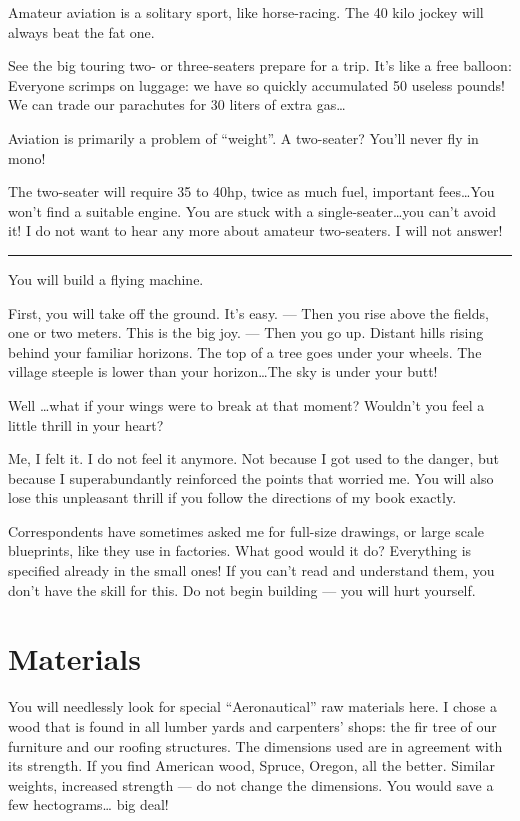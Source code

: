 \documentclass{book}
\newcommand*\sectline{
  \vspace{5pt}
  \begin{center}
    \rule{0.5\linewidth}{\linethickness}
  \end{center}
  \vspace{5pt}
}
\begin{document}
Amateur aviation is a solitary sport, like horse-racing. The 40 kilo
jockey will always beat the fat one.

See the big touring two- or three-seaters prepare for a trip. It's
like a free balloon: Everyone scrimps on luggage: we have so quickly
accumulated 50 useless pounds! We can trade our parachutes for 30
liters of extra gas\ldots

Aviation is primarily a problem of ``weight''. A two-seater? You'll
never fly in mono!

The two-seater will require 35 to 40hp, twice as much fuel, important
fees\ldots You won't find a suitable engine. You are stuck with a
single-seater\ldots you can't avoid it!  I do not want to hear any
more about amateur two-seaters. I will not answer!

\sectline

You will build a flying machine.

First, you will take off the ground. It's easy. --- Then you rise
above the fields, one or two meters. This is the big joy. --- Then you
go up.  Distant hills rising behind your familiar horizons. The top of
a tree goes under your wheels. The village steeple is lower than your
horizon\ldots The sky is under your butt!

Well \ldots what if your wings were to break at that moment?  Wouldn't
you feel a little thrill in your heart?

Me, I felt it. I do not feel it anymore. Not because I got used to the
danger, but because I superabundantly reinforced the points that
worried me. You will also lose this unpleasant thrill if you follow
the directions of my book exactly.

Correspondents have sometimes asked me for full-size drawings, or
large scale blueprints, like they use in factories. What good would it
do?  Everything is specified already in the small ones! If you can't
read and understand them, you don't have the skill for this. Do not
begin building --- you will hurt yourself.

\section{Materials}

You will needlessly look for special ``Aeronautical'' raw materials
here. I chose a wood that is found in all lumber yards and carpenters'
shops: the fir tree of our furniture and our roofing structures. The
dimensions used are in agreement with its strength. If you find
American wood, Spruce, Oregon, all the better. Similar weights,
increased strength --- do not change the dimensions. You would save a
few hectograms\ldots{} big deal!
\end{document}
